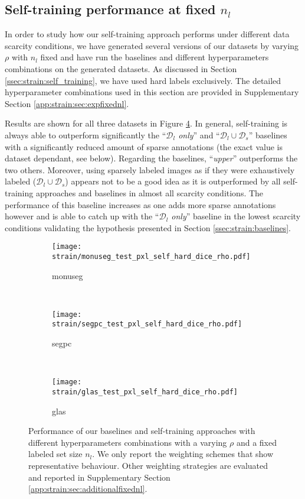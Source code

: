 \subsection{Self-training performance at fixed $n_l$}
\label{ssec:strain:fixednl}

In order to study how our self-training approach performs under different data scarcity conditions, we have generated several versions of our datasets by varying $\rho$ with $n_l$ fixed and have run the baselines and different hyperparameters combinations on the generated datasets. As discussed in Section \ref{ssec:strain:self_training}, we have used hard labels exclusively. The detailed hyperparameter combinations used in this section are provided in Supplementary Section \ref{app:strain:sec:expfixednl}.

Results are shown for all three datasets in Figure \ref{fig:strain:rho_exp}. In general, self-training is always able to outperform significantly the ``\textit{$\mathcal{D}_l$ only}'' and ``$\mathcal{D}_l \cup \mathcal{D}_s$'' baselines with a significantly reduced amount of sparse annotations (the exact value is dataset dependant, see below). Regarding the baselines, ``\textit{upper}''  outperforms the two others. Moreover, using sparsely labeled images as if they were exhaustively labeled (\ie $\mathcal{D}_l \cup \mathcal{D}_s$) appears not to be a good idea as it is outperformed by all self-training approaches and baselines in almost all scarcity conditions. The performance of this baseline increases as one adds more sparse annotations however and is able to catch up with the ``\textit{$\mathcal{D}_l$ only}'' baseline in the lowest scarcity conditions validating the hypothesis presented in Section \ref{ssec:strain:baselines}. 

\begin{figure}[th]
  \centering
    \begin{subfigure}{\textwidth}
    \centering
    \texttt{[image: strain/monuseg\_test\_pxl\_self\_hard\_dice\_rho.pdf]}
    \caption{\acrshort{monuseg}}
      \label{fig:strain:rho_exp_monuseg}
  \end{subfigure} \\
  \begin{subfigure}{\textwidth}
    \centering
    \texttt{[image: strain/segpc\_test\_pxl\_self\_hard\_dice\_rho.pdf]}
    \caption{\acrshort{segpc}}
    \label{fig:strain:rho_exp_segpc}
  \end{subfigure} \\
  \begin{subfigure}{\textwidth}
    \centering
    \texttt{[image: strain/glas\_test\_pxl\_self\_hard\_dice\_rho.pdf]}
    \caption{\acrshort{glas}}
    \label{fig:strain:rho_exp_glas}
  \end{subfigure}
  \caption{Performance of our baselines and self-training approaches with different hyperparameters combinations with a varying $\rho$ and a fixed labeled set size $n_l$. We only report the weighting schemes that show representative behaviour. Other weighting strategies are evaluated and reported in Supplementary Section \ref{app:strain:sec:additionalfixednl}.}
  \label{fig:strain:rho_exp}
\end{figure}

